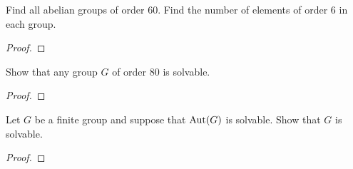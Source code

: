 \begin{problem}
Find all abelian groups of order $60$. Find the number of
elements of order $6$ in each group. %
\end{problem}
\begin{proof}
\end{proof}

\begin{problem}
Show that any group $G$ of order $80$ is solvable.
\end{problem}
\begin{proof}
\end{proof}

\begin{problem}
Let $G$ be a finite group and suppose that $\operatorname{Aut}(G)$ is
solvable. Show that $G$ is solvable.
\end{problem}
\begin{proof}
\end{proof}

